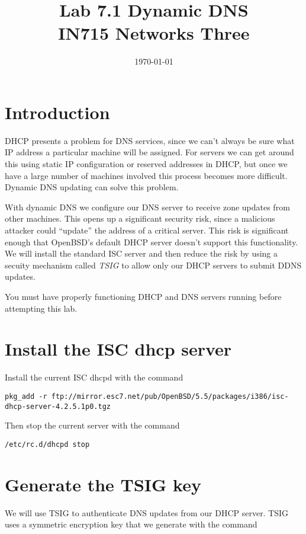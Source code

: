 \documentclass{article}
\begin{document}
\title{ Lab 7.1 Dynamic DNS\\ IN715 Networks Three}
\date{\today}
\maketitle

\section*{Introduction}
DHCP presents a problem for DNS services, since we can't always be sure what IP address a particular
machine will be assigned.  For servers we can get around this using static IP configuration or 
reserved addresses in DHCP, but once we have a large number of machines involved this process becomes more difficult.  Dynamic DNS updating can solve this problem.

With dynamic DNS we configure our DNS server to receive zone updates from other machines.  This opens up 
a significant security risk, since a malicious attacker could ``update'' the address of a critical 
server.  This risk is significant enough that OpenBSD's default DHCP server doesn't support this functionality.  We will install the standard ISC server and then reduce the risk by using a secuity mechanism called \emph{TSIG} to allow only
our DHCP servers to submit DDNS updates.  

You must have properly functioning DHCP and DNS servers running before attempting this lab.

\section{Install the ISC dhcp server}
Install the current ISC dhcpd with the command

\begin{verbatim}
pkg_add -r ftp://mirror.esc7.net/pub/OpenBSD/5.5/packages/i386/isc-dhcp-server-4.2.5.1p0.tgz
\end{verbatim}

Then stop the current server with the command

\begin{verbatim}
/etc/rc.d/dhcpd stop
\end{verbatim}

\section{Generate the TSIG key}
We will use TSIG to authenticate DNS updates from our DHCP server.  TSIG uses a symmetric encryption key that we generate with the command
\end{document}
